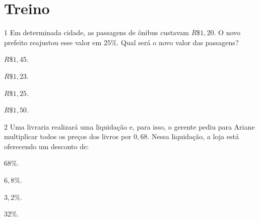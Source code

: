 

\section*{Treino}

\num{1}  Em determinada cidade, as passagens de ônibus custavam $R\$ 1,20$. O
novo prefeito reajustou esse valor em $25\%$. Qual será o novo valor das
passagens?

\begin{escolha}
\item $R\$ 1,45$.
\item $R\$ 1,23$.
\item $R\$ 1,25$.
\item $R\$ 1,50$.
\end{escolha}



\num{2}  Uma livraria realizará uma liquidação e, para isso, o gerente pediu
para Ariane multiplicar todos os preços dos livros por $0,68$. Nessa
liquidação, a loja está oferecendo um desconto de:

\begin{escolha}
\item $68\%$.
\item $6,8\%$.
\item $3,2\%$.
\item $32\%$.
\end{escolha}

